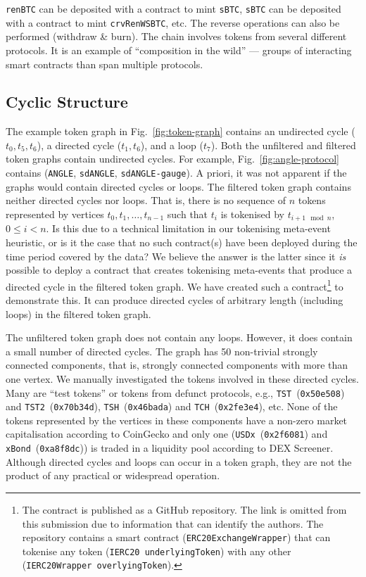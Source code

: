 \texttt{renBTC} can be deposited with a contract to mint
\texttt{sBTC}, \texttt{sBTC} can be deposited with a contract to mint
\texttt{crvRenWSBTC}, etc.  The reverse operations can also be
performed (withdraw \& burn).  The chain involves tokens from several
different protocols.  It is an example of ``composition in the wild''
--- groups of interacting smart contracts than span multiple
protocols.

\subsection{Cyclic Structure}\label{sec:analysis-cyclic-structure}

The example token graph in Fig.~\ref{fig:token-graph} contains an
undirected cycle ($t_0, t_5, t_6$), a directed cycle ($t_1, t_6$), and
a loop ($t_7$).  Both the unfiltered and filtered token graphs contain
undirected cycles.  For example, Fig.~\ref{fig:angle-protocol}
contains (\texttt{ANGLE}, \texttt{sdANGLE}, \texttt{sdANGLE-gauge}).
A priori, it was not apparent if the graphs would contain directed
cycles or loops.  The filtered token graph contains neither directed
cycles nor loops.  That is, there is no sequence of $n$ tokens
represented by vertices $t_0, t_1, \ldots, t_{n - 1}$ such that $t_i$
is tokenised by $t_{i + 1 \mod n}$, $0 \le i < n$.  Is this due to a
technical limitation in our tokenising meta-event heuristic, or is it
the case that no such contract(s) have been deployed during the time
period covered by the data?  We believe the answer is the latter since
it \textit{is} possible to deploy a contract that creates tokenising
meta-events that produce a directed cycle in the filtered token graph.
We have created such a contract\footnote{The contract is published as
a GitHub repository.  The link is omitted from this submission due to
information that can identify the authors.
The repository contains a smart contract
(\texttt{ERC20ExchangeWrapper}) that can tokenise any token
(\texttt{IERC20 underlyingToken}) with any other
(\texttt{IERC20Wrapper overlyingToken}).} to demonstrate this.  It can
produce directed cycles of arbitrary length (including loops) in the
filtered token graph.

The unfiltered token graph does not contain any loops.  However, it
does contain a small number of directed cycles.  The graph has
\num{50} non-trivial strongly connected components, that is, strongly
connected components with more than one vertex.  We manually
investigated the tokens involved in these directed cycles.  Many are
``test tokens'' or tokens from defunct protocols, e.g.,
\texttt{TST}~(\texttt{0x50e508}) and
\texttt{TST2}~(\texttt{0x70b34d}), \texttt{TSH}~(\texttt{0x46bada})
and \texttt{TCH}~(\texttt{0x2fe3e4}), etc.  None of the tokens
represented by the vertices in these components have a non-zero market
capitalisation according to CoinGecko and only one
(\texttt{USDx}~(\texttt{0x2f6081}) and
\texttt{xBond}~(\texttt{0xa8f8dc})) is traded in a liquidity pool
according to DEX Screener.  Although directed cycles and loops can
occur in a token graph, they are not the product of any practical or
widespread operation.
